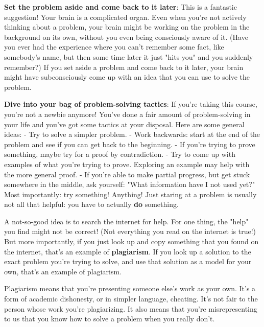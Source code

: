 \textbf{Set the problem aside and come back to it later}: This is a fantastic suggestion! Your brain is a complicated organ. Even when you're not actively thinking about a problem, your brain might be working on the problem in the background on its own, without you even being consciously aware of it. (Have you ever had the experience where you can't remember some fact, like somebody's name, but then some time later it just "hits you" and you suddenly remember?) If you set aside a problem and come back to it later, your brain might have subconsciously come up with an idea that you can use to solve the problem.

\textbf{Dive into your bag of problem-solving tactics}: If you're taking this course, you're not a newbie anymore! You've done a fair amount of problem-solving in your life and you've got some tactics at your disposal. Here are some general ideas:
- Try to solve a simpler problem.
- Work backwards: start at the end of the problem and see if you can get back to the beginning.
- If you're trying to prove something, maybe try for a proof by contradiction.
- Try to come up with examples of what you're trying to prove. Exploring an example may help with the more general proof.
- If you're able to make partial progress, but get stuck somewhere in the middle, ask yourself: "What information have I not used yet?"
Most importantly: try something! Anything! Just staring at a problem is usually not all that helpful: you have to actually \textbf{do} something.

A not-so-good idea is to search the internet for help. For one thing, the "help" you find might not be correct! (Not everything you read on the internet is true!) But more importantly, if you just look up and copy something that you found on the internet, that's an example of \textbf{plagiarism}. If you look up a solution to the exact problem you're trying to solve, and use that solution as a model for your own, that's an example of plagiarism.

Plagiarism means that you're presenting someone else's work as your own. It's a form of academic dishonesty, or in simpler language, cheating. It's not fair to the person whose work you're plagiarizing. It also means that you're misrepresenting to us that you know how to solve a problem when you really don't.

